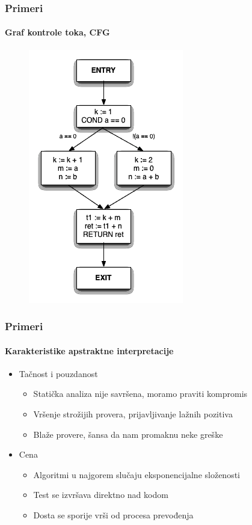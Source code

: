 \documentclass[xetex,mathserif,serif]{beamer}
\begin{document}
  \begin{frame}
	\frametitle{Primeri}
    \framesubtitle{Graf kontrole toka, CFG}
	\begin{center}
   		\begin{multicols}{2}
			
    		\begin{figure}
				\includegraphics[scale=0.4,right]{Treehydra-cfg.png}
			\end{figure}
		\end{multicols}
	\end{center}
  \end{frame}
  \begin{frame}
    \frametitle{Primeri}
    \framesubtitle{Karakteristike apstraktne interpretacije}
	\begin{center}
		\begin{itemize}
			\item Tačnost i pouzdanost
				\begin{itemize}
					\item Statička analiza nije savršena, moramo praviti kompromis
					\item Vršenje strožijih provera, prijavljivanje lažnih pozitiva
					\item Blaže provere, šansa da nam promaknu neke greške
				\end{itemize}
			\item Cena
				\begin{itemize}
					\item Algoritmi u najgorem slučaju eksponencijalne složenosti
					\item  {\color{green} Test se izvršava direktno nad kodom}
					\item {\color{red} Dosta se sporije vrši od procesa prevođenja}
				\end{itemize}
		\end{itemize}
	\end{center}
  \end{frame}
\end{document}
